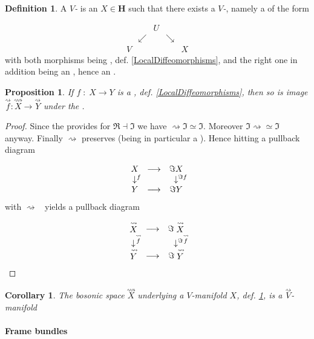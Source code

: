 \documentclass[12pt,titlepage]{article}
\def\mathrlap{\mathpalette\mathrlapinternal}
\def\mathrlapinternal#1#2{\rlap{$\mathsurround=0pt#1{#2}$}}
\newcommand{\itexarray}[1]{\begin{matrix}#1\end{matrix}}
\theoremstyle{plain}
\newtheorem{prop}{Proposition}
\newtheorem{cor}{Corollary}
\theoremstyle{definition}
\newtheorem{defn}{Definition}
\theoremstyle{remark}
\begin{document}
\begin{defn}
\label{VManifold}\hypertarget{VManifold}{}
A \emph{$V$-} is an $X \in \mathbf{H}$ such that there exists a \emph{$V$-}, namely a  of the form

\begin{displaymath}
\itexarray{
    && U
    \\
    & \swarrow && \searrow
    \\
    V && && X
  }
\end{displaymath}
with both morphisms being , def. \ref{LocalDiffeomorphisms}, and the right one in addition being an , hence an .

\end{defn}
\begin{prop}
\label{}\hypertarget{}{}
If $f \;\colon\; X \longrightarrow Y$ is a , def. \ref{LocalDiffeomorphisms}, then so is image $\stackrel{\rightsquigarrow}{f}\colon \stackrel{\rightsquigarrow}{X} \longrightarrow \stackrel{\rightsquigarrow}{Y}$ under the .

\end{prop}
\begin{proof}
Since the  provides  for $\Re\dashv \Im$ we have $\rightsquigarrow \Im \simeq \Im$. Moreover $\Im \rightsquigarrow \simeq \Im$ anyway. Finally $\rightsquigarrow$ preserves  (being in particular a ). Hence hitting a pullback diagram

\begin{displaymath}
\itexarray{
    X &\longrightarrow& \Im X
    \\
    \downarrow^{\mathrlap{f}} && \downarrow^{\mathrlap{\Im f}}
    \\
    Y &\longrightarrow& \Im Y
  }
\end{displaymath}
with $\rightsquigarrow\;\;$ yields a pullback diagram

\begin{displaymath}
\itexarray{
    \stackrel{\rightsquigarrow}{X} &\longrightarrow& \Im \stackrel{\rightsquigarrow}{X}
    \\
    \downarrow^{\mathrlap{\stackrel{\rightsquigarrow}{f}}} && \downarrow^{\mathrlap{\Im \stackrel{\rightsquigarrow}{f}}}
    \\
    \stackrel{\rightsquigarrow}{Y} &\longrightarrow& \Im \stackrel{\rightsquigarrow}{Y}
  }
\end{displaymath}
\end{proof}
\begin{cor}
\label{}\hypertarget{}{}
The bosonic space $\stackrel{\rightsquigarrow}{X}$ underlying a $V$-manifold $X$, def. \ref{VManifold}, is a $\stackrel{\rightsquigarrow}{V}$-manifold

\end{cor}
\hypertarget{FrameBundles}{}\paragraph*{{Frame bundles}}\label{FrameBundles}
\end{document}
